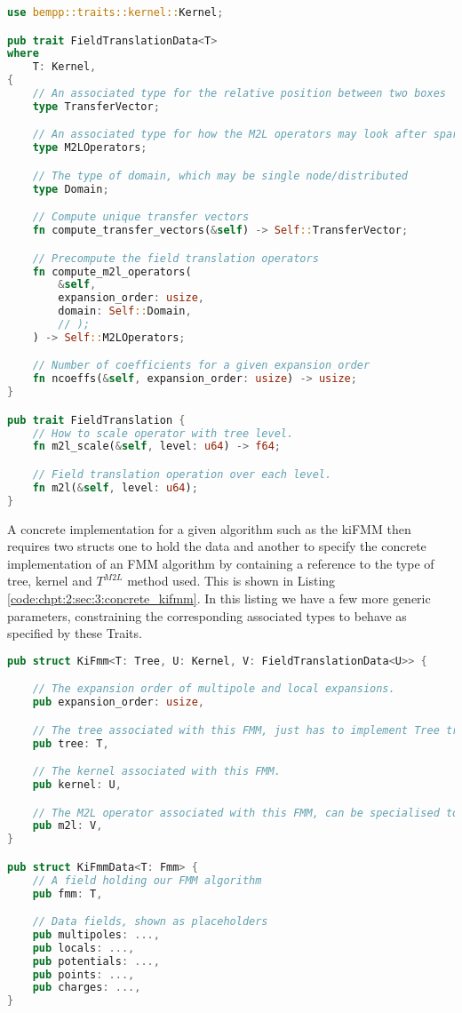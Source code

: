 \begin{lstlisting}[language=Rust, caption={Trait for Multipole to Local Field Translation},  label=code:chpt:2:sec:3:field_translation]
use bempp::traits::kernel::Kernel;

pub trait FieldTranslationData<T>
where
    T: Kernel,
{
    // An associated type for the relative position between two boxes
    type TransferVector;

    // An associated type for how the M2L operators may look after sparsification
    type M2LOperators;

    // The type of domain, which may be single node/distributed
    type Domain;

    // Compute unique transfer vectors
    fn compute_transfer_vectors(&self) -> Self::TransferVector;

    // Precompute the field translation operators
    fn compute_m2l_operators(
        &self,
        expansion_order: usize,
        domain: Self::Domain,
        // );
    ) -> Self::M2LOperators;

    // Number of coefficients for a given expansion order
    fn ncoeffs(&self, expansion_order: usize) -> usize;
}

pub trait FieldTranslation {
    // How to scale operator with tree level.
    fn m2l_scale(&self, level: u64) -> f64;

    // Field translation operation over each level.
    fn m2l(&self, level: u64);
}
\end{lstlisting}

A concrete implementation for a given algorithm such as the kiFMM then requires two structs one to hold the data and another to specify the concrete implementation of an FMM algorithm by containing a reference to the type of tree, kernel and $T^{M2L}$ method used. This is shown in Listing \ref{code:chpt:2:sec:3:concrete_kifmm}. In this listing we have a few more generic parameters, constraining the corresponding associated types to behave as specified by these Traits.

\begin{lstlisting}[language=Rust, caption={Structs that specify a concrete implementation of an FMM algorithm.},  label=code:chpt:2:sec:3:concrete_kifmm]
pub struct KiFmm<T: Tree, U: Kernel, V: FieldTranslationData<U>> {

    // The expansion order of multipole and local expansions.
    pub expansion_order: usize,

    // The tree associated with this FMM, just has to implement Tree trait, can be single or multi-node.
    pub tree: T,

    // The kernel associated with this FMM.
    pub kernel: U,

    // The M2L operator associated with this FMM, can be specialised to be sparsified using different methods.
    pub m2l: V,
}

pub struct KiFmmData<T: Fmm> {
    // A field holding our FMM algorithm
    pub fmm: T,

    // Data fields, shown as placeholders
    pub multipoles: ...,
    pub locals: ...,
    pub potentials: ...,
    pub points: ...,
    pub charges: ...,
}
\end{lstlisting}

